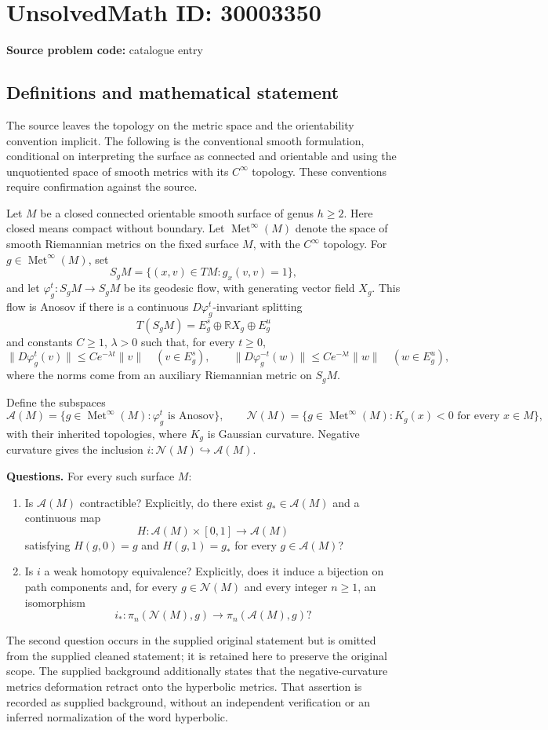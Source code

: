 \documentclass[11pt]{article}
\newcommand{\R}{\mathbb{R}}
\begin{document}
\section*{UnsolvedMath ID: 30003350}
\textbf{Source problem code:} catalogue entry
\subsection{Definitions and mathematical statement}
The source leaves the topology on the metric space and the orientability convention implicit. The following is the conventional smooth formulation, conditional on interpreting the surface as connected and orientable and using the unquotiented space of smooth metrics with its \(C^\infty\) topology. These conventions require confirmation against the source.

Let \(M\) be a closed connected orientable smooth surface of genus \(h\geq 2\). Here closed means compact without boundary. Let \(\operatorname{Met}^\infty(M)\) denote the space of smooth Riemannian metrics on the fixed surface \(M\), with the \(C^\infty\) topology. For \(g\in\operatorname{Met}^\infty(M)\), set
\[
S_gM=\{(x,v)\in TM:g_x(v,v)=1\},
\]
and let \(\varphi_g^t:S_gM\to S_gM\) be its geodesic flow, with generating vector field \(X_g\). This flow is Anosov if there is a continuous \(D\varphi_g^t\)-invariant splitting
\[
T(S_gM)=E_g^s\oplus\R X_g\oplus E_g^u
\]
and constants \(C\geq1\), \(\lambda>0\) such that, for every \(t\geq0\),
\[
\|D\varphi_g^t(v)\|\leq Ce^{-\lambda t}\|v\|\quad(v\in E_g^s),
\qquad
\|D\varphi_g^{-t}(w)\|\leq Ce^{-\lambda t}\|w\|\quad(w\in E_g^u),
\]
where the norms come from an auxiliary Riemannian metric on \(S_gM\).

Define the subspaces
\[
\mathcal A(M)=\{g\in\operatorname{Met}^\infty(M):\varphi_g^t\text{ is Anosov}\},
\qquad
\mathcal N(M)=\{g\in\operatorname{Met}^\infty(M):K_g(x)<0\text{ for every }x\in M\},
\]
with their inherited topologies, where \(K_g\) is Gaussian curvature. Negative curvature gives the inclusion \(i:\mathcal N(M)\hookrightarrow\mathcal A(M)\).

\textbf{Questions.} For every such surface \(M\):
\begin{enumerate}
\item Is \(\mathcal A(M)\) contractible? Explicitly, do there exist \(g_*\in\mathcal A(M)\) and a continuous map
\[
H:\mathcal A(M)\times[0,1]\longrightarrow\mathcal A(M)
\]
satisfying \(H(g,0)=g\) and \(H(g,1)=g_*\) for every \(g\in\mathcal A(M)\)?
\item Is \(i\) a weak homotopy equivalence? Explicitly, does it induce a bijection on path components and, for every \(g\in\mathcal N(M)\) and every integer \(n\geq1\), an isomorphism
\[
i_*:\pi_n(\mathcal N(M),g)\longrightarrow\pi_n(\mathcal A(M),g)?
\]
\end{enumerate}
The second question occurs in the supplied original statement but is omitted from the supplied cleaned statement; it is retained here to preserve the original scope. The supplied background additionally states that the negative-curvature metrics deformation retract onto the hyperbolic metrics. That assertion is recorded as supplied background, without an independent verification or an inferred normalization of the word hyperbolic.
\end{document}
